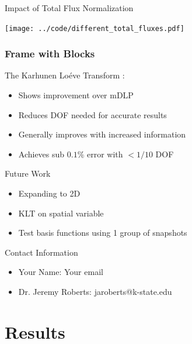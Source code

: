 \documentclass[fleqn]{beamer}
\begin{document}
    \begin{frame}{Impact of Total Flux Normalization}
         \begin{center}
             \texttt{[image: ../code/different\_total\_fluxes.pdf]}
         \end{center}
    \end{frame}

    \begin{frame}
        \frametitle{Frame with Blocks}
        \begin{block}{The Karhunen Lo\'{e}ve Transform :}
            \begin{itemize}
                \item Shows improvement over mDLP
                \item Reduces DOF needed for accurate results
                \item Generally improves with increased information
                \item Achieves sub $0.1\%$ error with $<1/10$ DOF
            \end{itemize}
        \end{block}
        \begin{block}{Future Work}
            \begin{itemize}
                \item Expanding to 2D
                \item KLT on spatial variable
                \item Test basis functions using 1 group of snapshots
            \end{itemize}
        \end{block}
        \begin{block}{Contact Information}
            \begin{itemize}
                \item Your Name: Your email
                \item Dr. Jeremy Roberts: jaroberts@k-state.edu
            \end{itemize}
        \end{block}
        
        \nocite{*}
    \end{frame}
    

    
    \section{Results}
    
\end{document}
